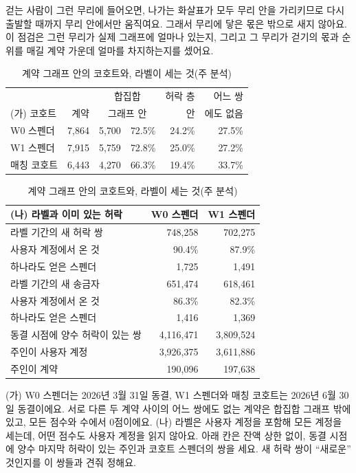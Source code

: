 \begin{puri}
걷는 사람이 그런 무리에 들어오면, 나가는 화살표가 모두 무리 안을 가리키므로 다시 출발할 때까지 무리 안에서만 움직여요. 그래서 무리에 닿은 몫은 밖으로 새지 않아요. 이 점검은 그런 무리가 실제 그래프에 얼마나 있는지, 그리고 그 무리가 걷기의 몫과 순위를 매길 계약 가운데 얼마를 차지하는지를 셌어요.
\end{puri}

\begin{table}[!ht]
\centering
\caption{계약 그래프 안의 코호트와, 라벨이 세는 것(주 분석)}
\label{tab:cohorts}
\small
\setlength{\tabcolsep}{4pt}
\begin{tabular}{@{}lrrrrr@{}}
\toprule
 & & \multicolumn{2}{c}{합집합} & 허락 층 & 어느 쌍 \\
(가) 코호트 & 계약 & \multicolumn{2}{c}{그래프 안} & 안 & 에도 없음 \\
\midrule
W0 스펜더 & 7{,}864 & 5{,}700 & 72.5\% & 24.2\% & 27.5\% \\
W1 스펜더 & 7{,}915 & 5{,}759 & 72.8\% & 25.0\% & 27.2\% \\
매칭 코호트 & 6{,}443 & 4{,}270 & 66.3\% & 19.4\% & 33.7\% \\
\bottomrule
\end{tabular}

\vspace{6pt}
\begin{tabular}{@{}lrr@{}}
\toprule
(나) 라벨과 이미 있는 허락 & W0 스펜더 & W1 스펜더 \\
\midrule
라벨 기간의 새 허락 쌍 & 748{,}258 & 702{,}275 \\
\quad 사용자 계정에서 온 것 & 90.4\% & 87.9\% \\
\quad 하나라도 얻은 스펜더 & 1{,}725 & 1{,}491 \\
라벨 기간의 새 송금자 & 651{,}474 & 618{,}461 \\
\quad 사용자 계정에서 온 것 & 86.3\% & 82.3\% \\
\quad 하나라도 얻은 스펜더 & 1{,}416 & 1{,}369 \\
\midrule
동결 시점에 양수 허락이 있는 쌍 & 4{,}116{,}471 & 3{,}809{,}524 \\
\quad 주인이 사용자 계정 & 3{,}926{,}375 & 3{,}611{,}886 \\
\quad 주인이 계약 & 190{,}096 & 197{,}638 \\
\bottomrule
\end{tabular}

\vspace{4pt}
\parbox{0.85\linewidth}{\footnotesize (가) W0 스펜더는 2026년 3월 31일 동결, W1 스펜더와 매칭 코호트는 2026년 6월 30일 동결이에요. 서로 다른 두 계약 사이의 어느 쌍에도 없는 계약은 합집합 그래프 밖에 있고, 모든 점수와 수에서 0점이에요. (나) 라벨은 사용자 계정을 포함해 모든 계정을 세는데, 어떤 점수도 사용자 계정을 읽지 않아요. 아래 칸은 잔액 상한 없이, 동결 시점에 양수 마지막 허락이 있는 주인과 코호트 스펜더의 쌍을 세요. 새 허락 쌍이 “새로운” 것인지를 이 쌍들과 견줘 정해요.}
\end{table}

